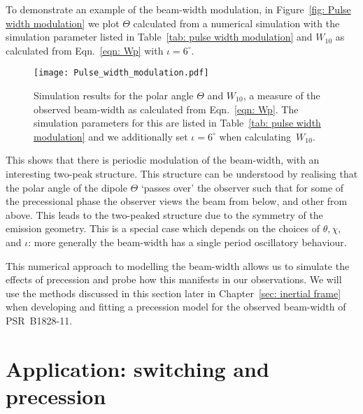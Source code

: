 \documentclass[../full_thesis/full_thesis.tex]{subfiles}
\newcommand{\thisdir}{../inertial_frame}
\begin{document}
To demonstrate an example of the beam-width modulation, in Figure~\ref{fig: Pulse width
modulation} we plot $\Theta$ calculated from a numerical simulation with the
simulation parameter listed in Table~\ref{tab: pulse width modulation} and
$W_{10}$ as calculated from Eqn.~\eqref{eqn: Wp} with $\iota=6^{\circ}$.
\begin{figure}[ht]
\centering
\texttt{[image: Pulse\_width\_modulation.pdf]}
\caption{Simulation results for the polar angle $\Theta$ and $W_{10}$, a
measure of the observed beam-width as calculated from Eqn.~\eqref{eqn: Wp}.
The simulation parameters for this are listed in Table~\ref{tab: pulse width modulation}
and we additionally set $\iota=6^{\circ}$ when calculating~$W_{10}$.}
\label{fig: Pulse width modulation}
\end{figure}
\begin{table}[htb]
\centering

\caption{Simulation parameters for the beam-width modulations plotted in
Figure~\ref{fig: Pulse width modulation}.}
\label{tab: pulse width modulation}
\end{table}

This shows that there is periodic modulation of the beam-width, with an
interesting two-peak structure. This structure can be understood by realising
that the polar angle of the dipole $\Theta$ `passes over' the observer such
that for some of the precessional phase the observer views the beam from below,
and other from above. This leads to the two-peaked structure due to the
symmetry of the emission geometry. This is a special case which depends on
the choices of $\theta, \chi$, and $\iota$: more generally the beam-width has
a single period oscillatory behaviour.

This numerical approach to modelling the beam-width allows us to simulate the
effects of precession and probe how this manifests in our observations.  We
will use the methods discussed in this section later in Chapter~\ref{sec:
inertial frame} when developing and fitting a precession model for the
observed beam-width of PSR~B1828-11.


\section{Application: switching and precession}
\label{sec: application switching and precession}
\end{document}
